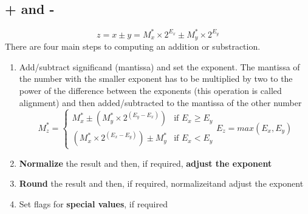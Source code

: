 \documentclass[10pt,a4paper]{book}
\begin{document}
\subsection{+ and -}
\[z=x\pm y=M^*_x\times 2^{E_x} \pm M^*_y\times 2^{E_y}\]
There are four main steps to computing an addition or substraction.
\begin{enumerate}
\item Add/subtract significand (mantissa) and set the exponent. The mantissa of the number with the smaller exponent has to be multiplied by two to the power of the difference between the exponents (this operation is called alignment) and then added/subtracted to the mantissa of the other number
\begin{equation*}
M^*_z = 
	\begin{cases}
        M^*_x \pm (M^*_y\times 2^{(E_y-E_x)}) &\text{if }E_x\geq E_y\\
        (M^*_x\times 2^{(E_x-E_y)}) \pm M^*_y &\text{if }E_x<E_y
    \end{cases}
E_z = max(E_x, E_y)
\end{equation*}
\item \textbf{Normalize} the result and then, if required, \textbf{adjust the exponent}
\item \textbf{Round} the result and then, if required, normalizeitand adjust the exponent
\item Set flags for \textbf{special values}, if required
\end{enumerate}
\end{document}
